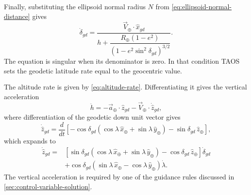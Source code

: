 Finally, substituting the ellipsoid normal radius $N$ from
\cref{eq:ellipsoid-normal-distance} gives
\begin{equation}
  \dot\delta_{gd}
  =\frac{\vec V_{\oplus}\mathbin{\cdot}\hat x_{gd}}
  {h+
    \dfrac{R_{\oplus}(1-e^2)}
    {\left(1-e^2\sin^2\delta_{gd}\right)^{3/2}}}.
  \label{eq:geodetic-latitude-rate-final}
\end{equation}
The equation is singular when its denominator is zero. In that condition TAOS sets
the geodetic latitude rate equal to the geocentric value.


The altitude rate is given by \cref{eq:altitude-rate}. Differentiating it gives the
vertical acceleration
\begin{equation}
  \ddot h
  =-\vec a_{\oplus}\mathbin{\cdot}\hat z_{gd}
   -\vec V_{\oplus}\mathbin{\cdot}\dot{\hat z}_{gd},
  \label{eq:altitude-acceleration}
\end{equation}
where differentiation of the geodetic down unit vector gives
\begin{equation}
  \dot{\hat z}_{gd}
  =\frac{d}{dt}
  \left[
    -\cos\delta_{gd}
      \left(
        \cos\lambda\,\hat x_{\oplus}
        +\sin\lambda\,\hat y_{\oplus}
      \right)
    -\sin\delta_{gd}\,\hat z_{\oplus}
  \right],
  \label{eq:geodetic-down-unit-vector-derivative-definition}
\end{equation}
which expands to
\begin{equation}
  \begin{aligned}
  \dot{\hat z}_{gd}={}&
    \left[
      \sin\delta_{gd}
      \left(
        \cos\lambda\,\hat x_{\oplus}
        +\sin\lambda\,\hat y_{\oplus}
      \right)
      -\cos\delta_{gd}\,\hat z_{\oplus}
    \right]\dot\delta_{gd}\\
  &+\cos\delta_{gd}
    \left(
      \sin\lambda\,\hat x_{\oplus}
      -\cos\lambda\,\hat y_{\oplus}
    \right)\dot\lambda.
  \end{aligned}
  \label{eq:geodetic-down-unit-vector-derivative}
\end{equation}
The vertical acceleration is required by one of the guidance rules discussed in
\cref{sec:control-variable-solution}.


